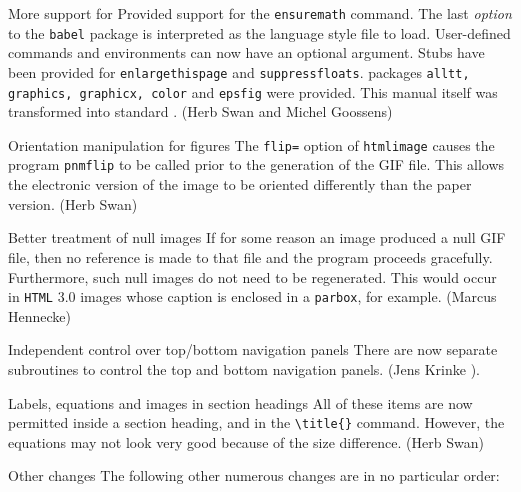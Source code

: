 \begin{changebar}
\begin{htmllist}
\item[More support for \LaTeXe] Provided support for the
\texttt{ensuremath} command.  The last \emph{option} to the \texttt{babel}
package is interpreted as the \latextohtml{} language style file to load.
User-defined commands and environments can now have an optional
argument.  Stubs have been provided for \texttt{enlargethispage}
and \texttt{suppressfloats}.  \LaTeXe packages \texttt{alltt,
graphics, graphicx, color} and \texttt{epsfig} were
provided.  This manual itself was transformed into standard
\LaTeXe.  (Herb Swan and Michel Goossens)

\item[Orientation manipulation for figures] The \texttt{flip=}
option of \texttt{htmlimage} causes the program \texttt{pnmflip} to
be called prior to the generation of the GIF file.  This allows
the electronic version of the image to be oriented differently
than the paper version.  (Herb Swan)

\item[Better treatment of null images]  If for some reason an
image produced a null GIF file, then no reference is made to that
file and the program proceeds gracefully.  Furthermore, such null
images do not need to be regenerated.  This would occur
in \texttt{HTML} 3.0 images whose caption is enclosed in a \texttt{parbox},
for example.  (Marcus Hennecke)

\item[Independent control over top/bottom navigation panels]
There are now separate subroutines to control the top and bottom
navigation panels.  (Jens Krinke ).

\item[Labels, equations and images in section headings]
All of these items are now permitted inside a section heading,
and in the \verb|\title{}| command.
However, the equations may not look very good because of the size
difference.  (Herb Swan)

\item[Other changes] The following other numerous changes are
in no particular order:


\end{htmllist}
\end{changebar}
